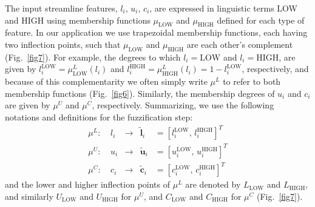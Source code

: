 The input streamline features, $l_{i}$, $u_{i}$, $c_{i}$, are expressed in linguistic terms LOW and HIGH using membership functions $\mu_{\textrm{LOW}}$ and $\mu_{\textrm{HIGH}}$ defined for each type of feature. In our application we use trapezoidal membership functions, each having two inflection points, such that $\mu_{\textrm{LOW}}$ and $\mu_{\textrm{HIGH}}$ are each other's complement (Fig.~\ref{fig7}). For example, the degrees to which $l_{i}=\textrm{LOW}$ and $l_{i}=\textrm{HIGH}$, are given by $l_{i}^{\textrm{LOW}}=\mu^{L}_{\textrm{LOW}}(l_{i})$ and $l_{i}^{\textrm{HIGH}}=\mu^{L}_{\textrm{HIGH}}(l_{i})=1-l_{i}^{\textrm{LOW}}$, respectively, and because of this complementarity we often simply write $\mu^{L}$ to refer to both membership functions (Fig.~\ref{fig6}). Similarly, the membership degrees of $u_{i}$ and $c_{i}$ are given by $\mu^{U}$ and $\mu^{C}$, respectively. Summarizing, we use the following notations and definitions for the fuzzification step:
\begin{equation}
\begin{array}{lcccl}
\mu^{L}\!:\ & l_{i} & \rightarrow & \tilde{\mathbf{l}}_{i} & = \left[l_{i}^{\textrm{LOW}}\!,\, l_{i}^{\textrm{HIGH}}\right]^T \\[1ex]
\mu^{U}\!:\ & u_{i} & \rightarrow & \tilde{\mathbf{u}}_{i} & = \left[u_{i}^{\textrm{LOW}}\!,\, u_{i}^{\textrm{HIGH}}\right]^T \\[1ex]
\mu^{C}\!:\ & c_{i} & \rightarrow & \tilde{\mathbf{c}}_{i} & = \left[c_{i}^{\textrm{LOW}}\!,\, c_{i}^{\textrm{HIGH}}\right]^T
\end{array}
\end{equation}
and the lower and higher inflection points of $\mu^{L}$ are denoted by $L_{\textrm{LOW}}$ and $L_{\textrm{HIGH}}$, and similarly $U_{\textrm{LOW}}$ and $U_{\textrm{HIGH}}$ for $\mu^{U}$, and $C_{\textrm{LOW}}$ and $C_{\textrm{HIGH}}$ for $\mu^{C}$ (Fig.~\ref{fig7}).


